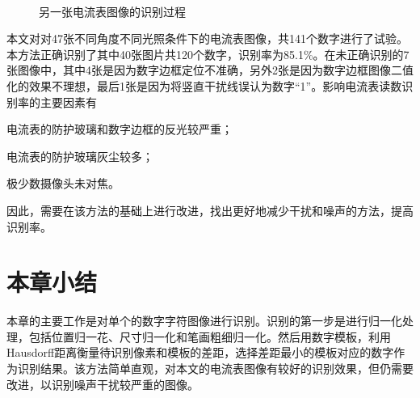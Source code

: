 \begin{figure}[h]
\centering
  \\
\hspace{2cm}
\hspace{2cm}
\caption{另一张电流表图像的识别过程}
\end{figure}
本文对对47张不同角度不同光照条件下的电流表图像，共141个数字进行了试验。本方法正确识别了其中40张图片共120个数字，识别率为85.1\%。在未正确识别的7张图像中，其中4张是因为数字边框定位不准确，另外2张是因为数字边框图像二值化的效果不理想，最后1张是因为将竖直干扰线误认为数字“1”。影响电流表读数识别率的主要因素有
\begin{inparaenum}[(1)]
\item 电流表的防护玻璃和数字边框的反光较严重；
\item 电流表的防护玻璃灰尘较多；
\item 极少数摄像头未对焦。
\end{inparaenum}
因此，需要在该方法的基础上进行改进，找出更好地减少干扰和噪声的方法，提高识别率。

\section{本章小结}

本章的主要工作是对单个的数字字符图像进行识别。识别的第一步是进行归一化处理，包括位置归一花、尺寸归一化和笔画粗细归一化。然后用数字模板，利用Hausdorff距离衡量待识别像素和模板的差距，选择差距最小的模板对应的数字作为识别结果。该方法简单直观，对本文的电流表图像有较好的识别效果，但仍需要改进，以识别噪声干扰较严重的图像。
